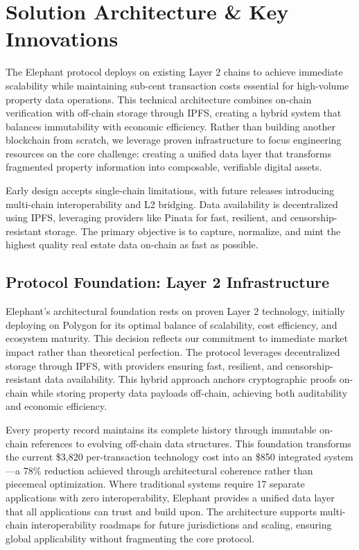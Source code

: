 \chapter{Solution Architecture \& Key Innovations}

The Elephant protocol deploys on existing Layer 2 chains to achieve immediate scalability while maintaining sub-cent transaction costs essential for high-volume property data operations. This technical architecture combines on-chain verification with off-chain storage through IPFS, creating a hybrid system that balances immutability with economic efficiency. Rather than building another blockchain from scratch, we leverage proven infrastructure to focus engineering resources on the core challenge: creating a unified data layer that transforms fragmented property information into composable, verifiable digital assets.

Early design accepts single-chain limitations, with future releases introducing multi-chain interoperability and L2 bridging. Data availability is decentralized using IPFS, leveraging providers like Pinata for fast, resilient, and censorship-resistant storage. The primary objective is to capture, normalize, and mint the highest quality real estate data on-chain as fast as possible.

\section{Protocol Foundation: Layer 2 Infrastructure}

Elephant's architectural foundation rests on proven Layer 2 technology, initially deploying on Polygon for its optimal balance of scalability, cost efficiency, and ecosystem maturity. This decision reflects our commitment to immediate market impact rather than theoretical perfection. The protocol leverages decentralized storage through IPFS, with providers ensuring fast, resilient, and censorship-resistant data availability. This hybrid approach anchors cryptographic proofs on-chain while storing property data payloads off-chain, achieving both auditability and economic efficiency.

Every property record maintains its complete history through immutable on-chain references to evolving off-chain data structures. This foundation transforms the current \$3,820 per-transaction technology cost into an \$850 integrated system—a 78\% reduction achieved through architectural coherence rather than piecemeal optimization. Where traditional systems require 17 separate applications with zero interoperability, Elephant provides a unified data layer that all applications can trust and build upon. The architecture supports multi-chain interoperability roadmaps for future jurisdictions and scaling, ensuring global applicability without fragmenting the core protocol.

